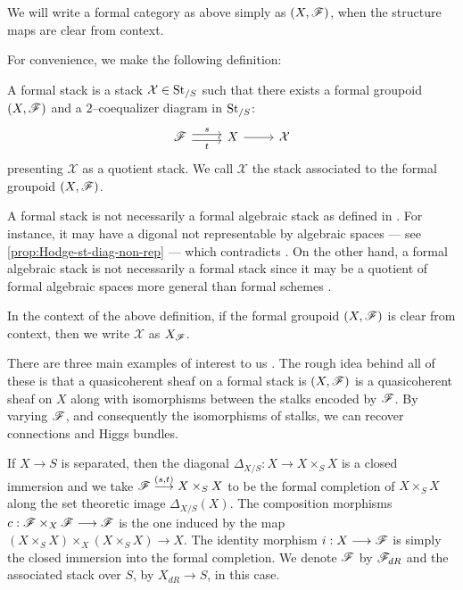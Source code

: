 \documentclass[11pt]{amsart}
\begin{document}
\begin{notn}
We will write a formal category as above simply as $(X, \mathscr{F})$,
when the structure maps are clear from context.
\end{notn}

For convenience, we make the following definition:
\begin{defn}
\label{defn:form-st}
A formal stack is a stack $\mathcal{X} \in \mathrm{St}_{/S}$ such that there exists
a formal groupoid $(X, \mathscr{F})$ and a $2$--coequalizer diagram in $\mathrm{St}_{/S}$:
\[\begin{tikzcd}
\sF \ar[r, shift left, "s"] \ar[r, shift right, "t" below] &
X \ar[r] &
\mathcal{X}
\end{tikzcd}\]
presenting $\mathcal{X}$ as a quotient stack.
We call $\mathcal{X}$ the stack associated to the formal groupoid
$(X, \mathscr{F})$.
\end{defn}

\begin{warn}
A formal stack is not necessarily a formal algebraic stack as defined in
\cite[Definition 5.3]{FormalAlgSt}. For instance, it may have a digonal
not representable by algebraic spaces --- see \cref{prop:Hodge-st-diag-non-rep}
--- which contradicts \cite[Lemma 5.12.]{FormalAlgSt}.
On the other hand, a formal algebraic stack is not necessarily a formal stack
since it may be a quotient of formal algebraic spaces more general than formal
schemes \cite[47]{FormalAlgSt}.
\end{warn}

\begin{notn}
In the context of the above definition, if the formal groupoid $(X, \mathscr{F})$
is clear from context, then we write $\mathcal{X}$ as $X_\mathscr{F}$.
\end{notn}

There are three main examples of interest to us \cite[31---33]{NonAbHodgeFilt}.
The rough idea behind all of these is that a quasicoherent sheaf on
a formal stack is $(X, \mathscr{F})$ is a quasicoherent sheaf on $X$ along with
isomorphisms between the stalks encoded by $\mathscr{F}$. By varying $\mathscr{F}$,
and consequently the isomorphisms of stalks, we can recover connections and
Higgs bundles.

\begin{exm}
\label{exm:dR-st}
If $X \to S$ is separated, then the diagonal $\Delta_{X/S} : X \to X \times_S X$
is a closed immersion and we take $\sF \to[{(s, t)}] X \times_S X$ to be the
formal completion of $X \times_S X$ along the set theoretic image
$\Delta_{X/S}(X)$. The composition morphisms $c : \sF \times_X \sF \to \sF$
is the one induced by the map
$(X \times_S X) \times_X (X \times_S X) \to X$.
The identity morphism $i : X \to \sF$
is simply the closed immersion into the formal completion.
We denote $\mathscr{F}$ by $\mathscr{F}_{dR}$ and the associated stack over $S$, by
$X_{dR} \to S$, in this case.
\end{exm}
\end{document}
